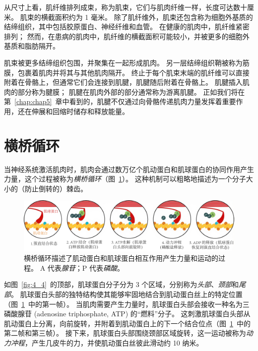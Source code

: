 从尺寸上看，肌纤维排列成束，称为肌束，它们与肌肉纤维一样，长度可达数十厘米。
肌束的横截面积约为 1 毫米。
除了肌纤维外，肌束还包含称为细胞外基质的结缔组织，其中包括胶原蛋白、神经纤维和血管。
在健康的肌肉中，肌纤维紧密排列；
然而，在患病的肌肉中，肌纤维的横截面积可能较小，并被更多的细胞外基质和脂肪隔开。


肌束被更多结缔组织包围，并聚集在一起形成肌肉。
另一层结缔组织鞘被称为筋膜，包裹着肌肉并将其与其他肌肉隔开。
终止于每个肌束末端的肌纤维可以直接附着在骨骼上，但通常它们会连接到肌腱，肌腱随后附着在骨骼上。
肌腱插入肌肉的部分称为腱膜；
肌腱在肌肉外部的部分通常称为游离肌腱。
正如我们将在第~\ref{chap:chap5}~章中看到的，肌腱不仅通过向骨骼传递肌肉力量发挥着重要作用，还在伸展和回缩时储存和释放能量。


\section{横桥循环}

当神经系统激活肌肉时，肌肉会通过数万亿个\textcolor[RGB]{226,128,39}{肌动蛋白}和\textcolor[RGB]{198,9,5}{肌球蛋白}的协同作用产生力量，这个过程被称为\textit{横桥循环}（图~\ref{fig:4_3}）。
这种机制可以粗略地描述为一个分子大小的（防止倒转的）棘齿。


\begin{figure}[!htb]
	\centering
	\includegraphics[width=1.0\linewidth]{chap4/4_3}
	\caption{横桥循环描述了\textcolor[RGB]{226,128,39}{肌动蛋白}和\textcolor[RGB]{198,9,5}{肌球蛋白}相互作用产生力量和运动的过程。
		A 代表\textit{腺苷}；P 代表\textit{磷酸}。 \label{fig:4_3}}
\end{figure}

如图~\ref{fig:4_4}~的顶部，肌球蛋白分子分为 3 个区域，分别称为\textit{头部}、\textit{颈部}和\textit{尾部}。
\textcolor[RGB]{198,9,5}{肌球蛋白}头部的独特结构使其能够牢固地结合到\textcolor[RGB]{226,128,39}{肌动蛋白}丝上的特定位置（图~\ref{fig:4_3}~中的第一帧）。
当肌肉需要产生力量时，\textcolor[RGB]{198,9,5}{肌球蛋白}头部会接收一种名为三磷酸腺苷 (adenosine triphosphate, ATP) 的“燃料”分子。
这刺激\textcolor[RGB]{198,9,5}{肌球蛋白}头部从\textcolor[RGB]{226,128,39}{肌动蛋白}上分离，向前旋转，并附着到肌动蛋白上的下一个结合位点（图~\ref{fig:4_3}~中的第二帧和第三帧）。
接下来，\textcolor[RGB]{198,9,5}{肌球蛋白}头部围绕颈部区域旋转，这一运动被称为\textit{动力冲程}，产生几皮牛的力，并使肌动蛋白丝彼此滑动约 10 纳米。


